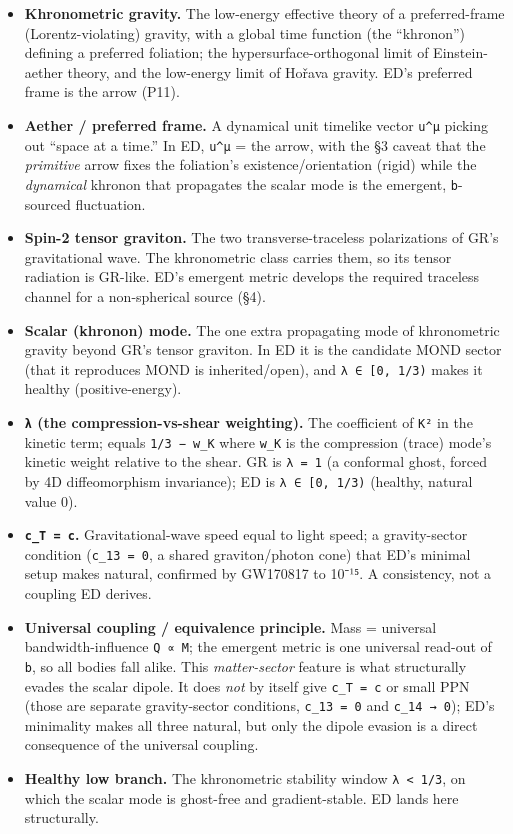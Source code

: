 \documentclass[
]{article}
\providecommand{\tightlist}{%
  \setlength{\itemsep}{0pt}\setlength{\parskip}{0pt}}
\begin{document}
\begin{itemize}
\tightlist
\item
  \textbf{Khronometric gravity.} The low-energy effective theory of a
  preferred-frame (Lorentz-violating) gravity, with a global time
  function (the ``khronon'') defining a preferred foliation; the
  hypersurface-orthogonal limit of Einstein-aether theory, and the
  low-energy limit of Hořava gravity. ED's preferred frame is the arrow
  (P11).
\item
  \textbf{Aether / preferred frame.} A dynamical unit timelike vector
  \texttt{u\^{}μ} picking out ``space at a time.'' In ED,
  \texttt{u\^{}μ} = the arrow, with the §3 caveat that the
  \emph{primitive} arrow fixes the foliation's existence/orientation
  (rigid) while the \emph{dynamical} khronon that propagates the scalar
  mode is the emergent, \texttt{b}-sourced fluctuation.
\item
  \textbf{Spin-2 tensor graviton.} The two transverse-traceless
  polarizations of GR's gravitational wave. The khronometric class
  carries them, so its tensor radiation is GR-like. ED's emergent metric
  develops the required traceless channel for a non-spherical source
  (§4).
\item
  \textbf{Scalar (khronon) mode.} The one extra propagating mode of
  khronometric gravity beyond GR's tensor graviton. In ED it is the
  candidate MOND sector (that it reproduces MOND is inherited/open), and
  \texttt{λ\ ∈\ {[}0,\ 1/3)} makes it healthy (positive-energy).
\item
  \textbf{\texttt{λ} (the compression-vs-shear weighting).} The
  coefficient of \texttt{K²} in the kinetic term; equals
  \texttt{1/3\ −\ w\_K} where \texttt{w\_K} is the compression (trace)
  mode's kinetic weight relative to the shear. GR is \texttt{λ\ =\ 1} (a
  conformal ghost, forced by 4D diffeomorphism invariance); ED is
  \texttt{λ\ ∈\ {[}0,\ 1/3)} (healthy, natural value 0).
\item
  \textbf{\texttt{c\_T\ =\ c}.} Gravitational-wave speed equal to light
  speed; a gravity-sector condition (\texttt{c\_13\ =\ 0}, a shared
  graviton/photon cone) that ED's minimal setup makes natural, confirmed
  by GW170817 to 10⁻¹⁵. A consistency, not a coupling ED derives.
\item
  \textbf{Universal coupling / equivalence principle.} Mass = universal
  bandwidth-influence \texttt{Q\ ∝\ M}; the emergent metric is one
  universal read-out of \texttt{b}, so all bodies fall alike. This
  \emph{matter-sector} feature is what structurally evades the scalar
  dipole. It does \emph{not} by itself give \texttt{c\_T\ =\ c} or small
  PPN (those are separate gravity-sector conditions,
  \texttt{c\_13\ =\ 0} and \texttt{c\_14\ →\ 0}); ED's minimality makes
  all three natural, but only the dipole evasion is a direct consequence
  of the universal coupling.
\item
  \textbf{Healthy low branch.} The khronometric stability window
  \texttt{λ\ \textless{}\ 1/3}, on which the scalar mode is ghost-free
  and gradient-stable. ED lands here structurally.
\end{itemize}
\end{document}
